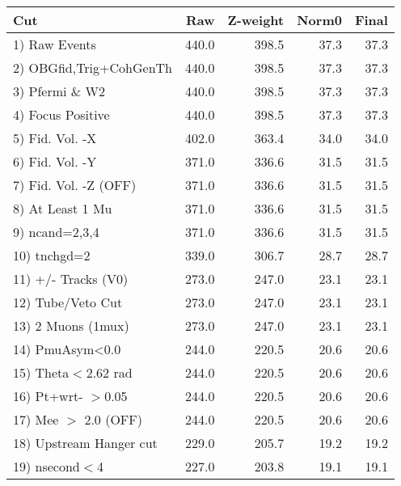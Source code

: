  \begin{table}[h!]\centering
 \begin{tabular}{||l||r|r|r|r||}
 \hline
 \hline
 Cut & Raw & Z-weight & Norm0 & Final \\
 \hline
  1) Raw Events           &       440.0 &       398.5 &        37.3 &        37.3 \\
  2) OBGfid,Trig+CohGenTh &       440.0 &       398.5 &        37.3 &        37.3 \\
  3) Pfermi \& W2         &       440.0 &       398.5 &        37.3 &        37.3 \\
  4) Focus Positive       &       440.0 &       398.5 &        37.3 &        37.3 \\
  5) Fid. Vol. -X         &       402.0 &       363.4 &        34.0 &        34.0 \\
  6) Fid. Vol. -Y         &       371.0 &       336.6 &        31.5 &        31.5 \\
  7) Fid. Vol. -Z (OFF)   &       371.0 &       336.6 &        31.5 &        31.5 \\
  8) At Least 1 Mu        &       371.0 &       336.6 &        31.5 &        31.5 \\
  9) ncand=2,3,4          &       371.0 &       336.6 &        31.5 &        31.5 \\
 10) tnchgd=2             &       339.0 &       306.7 &        28.7 &        28.7 \\
 11) +/- Tracks (V0)      &       273.0 &       247.0 &        23.1 &        23.1 \\
 12) Tube/Veto Cut        &       273.0 &       247.0 &        23.1 &        23.1 \\
 13) 2 Muons (1mux)       &       273.0 &       247.0 &        23.1 &        23.1 \\
 14) PmuAsym<0.0          &       244.0 &       220.5 &        20.6 &        20.6 \\
 15) Theta$<$2.62 rad     &       244.0 &       220.5 &        20.6 &        20.6 \\
 16) Pt+wrt- $>$0.05      &       244.0 &       220.5 &        20.6 &        20.6 \\
 17) Mee $>$ 2.0  (OFF)   &       244.0 &       220.5 &        20.6 &        20.6 \\
 18) Upstream Hanger cut  &       229.0 &       205.7 &        19.2 &        19.2 \\
 19) nsecond$<$4          &       227.0 &       203.8 &        19.1 &        19.1 \\

\end{tabular}
\end{table}
